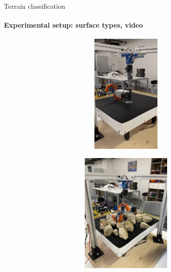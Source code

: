 \documentclass[aspectratio=169,xcolor=table]{beamer}
\begin{document}
\begin{frame}[t]{Terrain classification}
    \framesubtitle{Experimental setup: surface types, video}
    \vspace{-15pt}
    \begin{figure}[H]
        \begin{subfigure}{0.49\textwidth}
            \href{https://gifyu.com/image/SxatY}
            {\centering\includegraphics[height=6cm,width=1\textwidth,keepaspectratio]{s_shape_leg/flat.jpg}}
        \end{subfigure}
        \hfill
        \begin{subfigure}{0.49\textwidth}
            \href{https://gifyu.com/image/Sxatt}
            {\centering\includegraphics[height=6cm,width=1\textwidth,keepaspectratio]{s_shape_leg/view.jpg}}
        \end{subfigure}
    \end{figure}
\end{frame}

\end{document}

